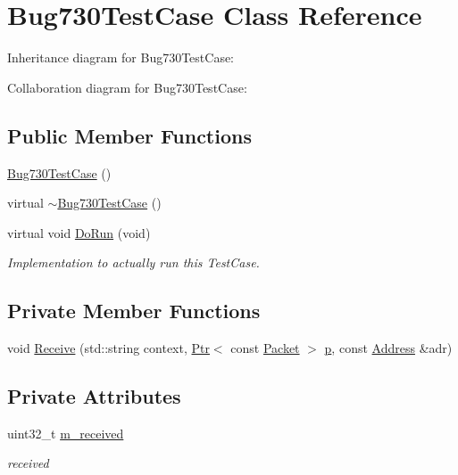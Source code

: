 \hypertarget{classBug730TestCase}{}\section{Bug730\+Test\+Case Class Reference}
\label{classBug730TestCase}


Inheritance diagram for Bug730\+Test\+Case\+:


Collaboration diagram for Bug730\+Test\+Case\+:
\subsection*{Public Member Functions}
\begin{DoxyCompactItemize}
\item 
\hyperlink{classBug730TestCase_a012d3d448fb216377389fd2ed817d348}{Bug730\+Test\+Case} ()
\item 
virtual \hyperlink{classBug730TestCase_a518dc58e7e0d4c323bf7ef7400168061}{$\sim$\+Bug730\+Test\+Case} ()
\item 
virtual void \hyperlink{classBug730TestCase_a9c8853ac24b9200f16c7993ec8df8eda}{Do\+Run} (void)
\begin{DoxyCompactList}\small\item\em Implementation to actually run this Test\+Case. \end{DoxyCompactList}\end{DoxyCompactItemize}
\subsection*{Private Member Functions}
\begin{DoxyCompactItemize}
\item 
void \hyperlink{classBug730TestCase_a8d51a4e071f00ea8d995802d1aa4cae1}{Receive} (std\+::string context, \hyperlink{classns3_1_1Ptr}{Ptr}$<$ const \hyperlink{classns3_1_1Packet}{Packet} $>$ \hyperlink{lte__link__budget__x2__handover__measures_8m_ac9de518908a968428863f829398a4e62}{p}, const \hyperlink{classns3_1_1Address}{Address} \&adr)
\end{DoxyCompactItemize}
\subsection*{Private Attributes}
\begin{DoxyCompactItemize}
\item 
uint32\+\_\+t \hyperlink{classBug730TestCase_adcd611e94c2c190d0195a229f0331c71}{m\+\_\+received}
\begin{DoxyCompactList}\small\item\em received \end{DoxyCompactList}\end{DoxyCompactItemize}
